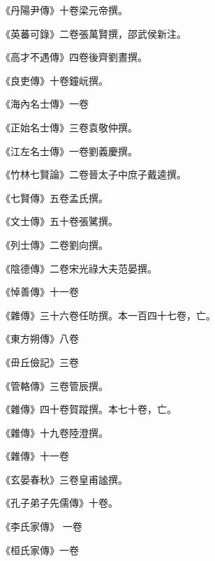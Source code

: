 \begin{pinyinscope}
 《丹陽尹傳》十卷梁元帝撰。



 《英蕃可錄》二卷張萬賢撰，邵武侯新注。



 《高才不遇傳》四卷後齊劉晝撰。



 《良吏傳》十卷鐘岏撰。



 《海內名士傳》一卷



 《正始名士傳》三卷袁敬仲撰。



 《江左名士傳》一卷劉義慶撰。



 《竹林七賢論》二卷晉太子中庶子戴逵撰。



 《七賢傳》五卷孟氏撰。



 《文士傳》五十卷張騭撰。



 《列士傳》二卷劉向撰。



 《陰德傳》二卷宋光祿大夫范晏撰。



 《悼善傳》十一卷



 《雜傳》三十六卷任昉撰。本一百四十七卷，亡。



 《東方朔傳》八卷



 《毌丘儉記》三卷



 《管輅傳》三卷管辰撰。



 《雜傳》四十卷賀蹤撰。本七十卷，亡。



 《雜傳》十九卷陸澄撰。



 《雜傳》十一卷



 《玄晏春秋》三卷皇甫謐撰。



 《孔子弟子先儒傳》十卷。



 《李氏家傳》
 一卷



 《桓氏家傳》一卷




\end{pinyinscope}
